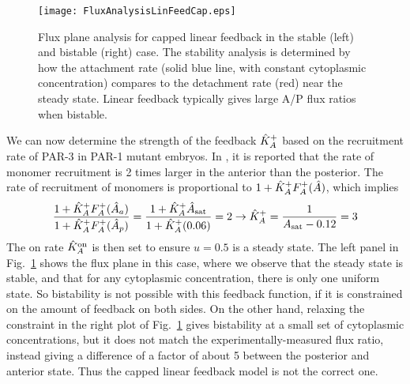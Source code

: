 \documentclass[11pt]{article}
\newcommand{\6}[1]{#1_{\text{6}}}
\newcommand{\3}[1]{#1_{\text{3}}}
\begin{document}
\begin{figure}
\centering
\texttt{[image: FluxAnalysisLinFeedCap.eps]}
\caption{\label{fig:P3Cap}Flux plane analysis for capped linear feedback in the stable (left) and bistable (right) case. The stability analysis is determined by how the attachment rate (solid blue line, with constant cytoplasmic concentration) compares to the detachment rate (red) near the steady state. Linear feedback typically gives large A/P flux ratios when bistable.}
\end{figure}


We can now determine the strength of the feedback $\hat{K}^\text{+}_A$ based on the recruitment rate of PAR-3 in PAR-1 mutant embryos. In \cite[Fig.~5A]{lang2023oligomerization}, it is reported that the rate of monomer recruitment is 2 times larger in the anterior than the posterior. The rate of recruitment of monomers is proportional to $1+\hat{K}^\text{+}_A  F_A^+(\hat A)$, which implies
\begin{equation}
\frac{1+\hat{K}^\text{+}_A  F_A^+(\hat A_a)}{1+\hat{K}^\text{+}_A  F_A^+(\hat A_p)}=\frac{1+\hat{K}^\text{+}_A \hat A_\text{sat}}{1+\hat{K}^\text{+}_A (0.06)}=2 \rightarrow \hat{K}^\text{+}_A = \frac{1}{A_\text{sat}-0.12}=3
\end{equation}
The on rate $\hat{K}^\text{on}_A$ is then set to ensure $u=0.5$ is a steady state. The left panel in Fig.\ \ref{fig:P3Cap} shows the flux plane in this case, where we observe that the steady state is stable, and that for any cytoplasmic concentration, there is only one uniform state. So bistability is not possible with this feedback function, if it is constrained on the amount of feedback on both sides. On the other hand, relaxing the constraint in the right plot of Fig.\ \ref{fig:P3Cap} gives bistability at a small set of cytoplasmic concentrations, but it does not match the experimentally-measured flux ratio, instead giving a difference of a factor of about 5 between the posterior and anterior state. Thus the capped linear feedback model is not the correct one.
\end{document}
